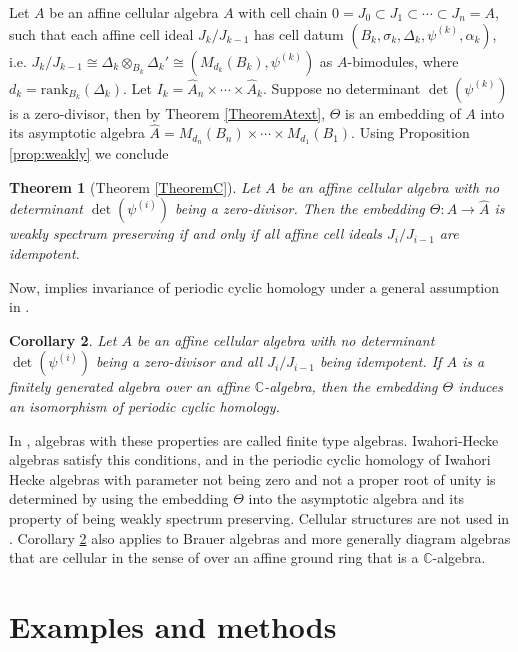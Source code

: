 \documentclass[oneside, a4paper, 11pt]{amsart}
\newtheorem{theorem}{Theorem}
\newtheorem{corollary}[theorem]{Corollary}
\newcommand{\asym}{\widehat{A}}
\newcommand{\rank}{\mathrm{rank}}
\begin{document}
Let $A$ be an affine cellular algebra $A$ with cell chain $0=J_0 \subset J_1 \subset \cdots \subset J_n=A$, such that each affine cell ideal $J_k/J_{k-1}$ has cell datum $(B_k, \sigma_k, \Delta_k,  \psi^{(k)},\alpha_k)$, i.e. $J_k/J_{k-1}\cong \Delta_k \otimes_{B_k}  \Delta_k' \cong \left( M_{d_k}(B_k), \psi^{(k)} \right)$ as $A$-bimodules, where $d_k=\rank_{B_k}(\Delta_k)$. Let $I_k = \asym_n \times   \cdots \times \asym_k$. Suppose no determinant $\det(\psi^{(k)})$ is a zero-divisor, then by Theorem \ref{TheoremAtext}, $\Theta$ is an embedding of $A$ into its asymptotic algebra $\asym = M_{d_n}(B_n)\times \cdots \times M_{d_1}(B_1)$. 
Using Proposition \ref{prop:weakly} we conclude
\begin{theorem}[Theorem \ref{TheoremC}] \label{TheoremCtext}
 Let $A$ be an affine cellular algebra with no determinant $\det(\psi^{(i)})$ being a zero-divisor. Then the embedding $\Theta:A\to \asym$ is weakly spectrum preserving if and only if all affine cell ideals $J_i/J_{i-1}$ are idempotent.
 \end{theorem}

 Now, \cite[Theorem 9]{BN} implies invariance of periodic cyclic homology
 under a general assumption in \cite{BN}. 
 
\begin{corollary}\label{pch}
  Let $A$ be an affine cellular algebra with no determinant $\det(\psi^{(i)})$
  being a zero-divisor and all $J_i/J_{i-1}$ being idempotent.
  If  $A$ is
  a finitely generated algebra over an affine $\mathbb{C}$-algebra, then the
  embedding $\Theta$ induces
 an isomorphism of periodic cyclic homology. 
\end{corollary}

In \cite{BN}, algebras with these properties are called finite type
algebras. Iwahori-Hecke algebras satisfy this conditions, and in \cite{BN}
the periodic cyclic homology of Iwahori Hecke algebras with parameter
not being zero and not a proper root of unity is determined by
using the embedding $\Theta$ into the asymptotic algebra and its property
of being weakly spectrum preserving. Cellular structures are not used in
\cite{BN}. Corollary \ref{pch} also applies to Brauer algebras and more
generally diagram algebras that are cellular in the sense of
\cite{GrahamLehrer} over an affine ground ring that is a $\mathbb{C}$-algebra.




\section{Examples and methods}
\end{document}
